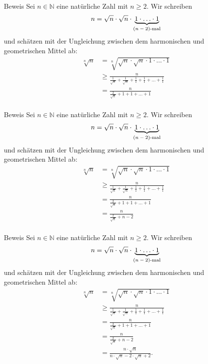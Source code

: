 \documentclass[10pt]{beamer}
\def\bN{\mathbb{N}}
\begin{document}
\begin{frame}{Beweis}
    Sei \( n \in \bN \) eine natürliche Zahl mit \( n \geq 2 \). Wir schreiben
    \[ 
        n = \sqrt{n} \cdot \sqrt{n} \cdot \underbrace{1 \cdot \ldots \cdot 1}_{\text{\( \left( n - 2 \right) \)-mal}} 
    \] 
    und schätzen mit der Ungleichung zwischen dem harmonischen und geometrischen Mittel ab:
    \begin{align*}
        \sqrt[n]{n}
        & = \sqrt[n]{\sqrt{n} \cdot \sqrt{n} \cdot 1 \cdot \ldots \cdot 1} \\
        & \geq \frac{n}{\frac{1}{\sqrt{n}} + \frac{1}{\sqrt{n}} + \frac{1}{1} + \frac{1}{1} + \ldots + \frac{1}{1}} \\
        & =	\frac{n}{\frac{2}{\sqrt{n}} + 1 + 1 + \ldots + 1} \\
    \end{align*}
\end{frame}



\begin{frame}{Beweis}
    Sei \( n \in \bN \) eine natürliche Zahl mit \( n \geq 2 \). Wir schreiben
    \[ 
        n = \sqrt{n} \cdot \sqrt{n} \cdot \underbrace{1 \cdot \ldots \cdot 1}_{\text{\( \left( n - 2 \right) \)-mal}} 
    \] 
    und schätzen mit der Ungleichung zwischen dem harmonischen und geometrischen Mittel ab:
    \begin{align*}
        \sqrt[n]{n}
        & = \sqrt[n]{\sqrt{n} \cdot \sqrt{n} \cdot 1 \cdot \ldots \cdot 1} \\
        & \geq \frac{n}{\frac{1}{\sqrt{n}} + \frac{1}{\sqrt{n}} + \frac{1}{1} + \frac{1}{1} + \ldots + \frac{1}{1}} \\
        & =	\frac{n}{\frac{2}{\sqrt{n}} + 1 + 1 + \ldots + 1} \\
        & = \frac{n}{\frac{2}{\sqrt{n}} + n - 2} \\
    \end{align*}
\end{frame}



\begin{frame}{Beweis}
    Sei \( n \in \bN \) eine natürliche Zahl mit \( n \geq 2 \). Wir schreiben
    \[ 
        n = \sqrt{n} \cdot \sqrt{n} \cdot \underbrace{1 \cdot \ldots \cdot 1}_{\text{\( \left( n - 2 \right) \)-mal}} 
    \] 
    und schätzen mit der Ungleichung zwischen dem harmonischen und geometrischen Mittel ab:
    \begin{align*}
        \sqrt[n]{n}
        & = \sqrt[n]{\sqrt{n} \cdot \sqrt{n} \cdot 1 \cdot \ldots \cdot 1} \\
        & \geq \frac{n}{\frac{1}{\sqrt{n}} + \frac{1}{\sqrt{n}} + \frac{1}{1} + \frac{1}{1} + \ldots + \frac{1}{1}} \\
        & =	\frac{n}{\frac{2}{\sqrt{n}} + 1 + 1 + \ldots + 1} \\
        & = \frac{n}{\frac{2}{\sqrt{n}} + n - 2} \\
        & = \frac{n \cdot \sqrt{n}}{n \cdot \sqrt{n} - 2 \cdot \sqrt{n} + 2}.
    \end{align*}
\end{frame}
\end{document}
